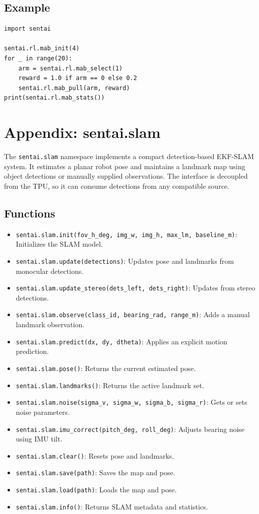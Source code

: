 \subsection{Example}\label{example-21}

\begin{verbatim}
import sentai

sentai.rl.mab_init(4)
for _ in range(20):
    arm = sentai.rl.mab_select(1)
    reward = 1.0 if arm == 0 else 0.2
    sentai.rl.mab_pull(arm, reward)
print(sentai.rl.mab_stats())
\end{verbatim}

\section{Appendix: sentai.slam}\label{appendix-sentai.slam}

The \texttt{sentai.slam} namespace implements a compact detection-based
EKF-SLAM system. It estimates a planar robot pose and maintains a
landmark map using object detections or manually supplied observations.
The interface is decoupled from the TPU, so it can consume detections
from any compatible source.

\subsection{Functions}\label{functions-22}

\begin{itemize}
\tightlist
\item
  \texttt{sentai.slam.init(fov\_h\_deg,\ img\_w,\ img\_h,\ max\_lm,\ baseline\_m)}:
  Initializes the SLAM model.
\item
  \texttt{sentai.slam.update(detections)}: Updates pose and landmarks
  from monocular detections.
\item
  \texttt{sentai.slam.update\_stereo(dets\_left,\ dets\_right)}: Updates
  from stereo detections.
\item
  \texttt{sentai.slam.observe(class\_id,\ bearing\_rad,\ range\_m)}:
  Adds a manual landmark observation.
\item
  \texttt{sentai.slam.predict(dx,\ dy,\ dtheta)}: Applies an explicit
  motion prediction.
\item
  \texttt{sentai.slam.pose()}: Returns the current estimated pose.
\item
  \texttt{sentai.slam.landmarks()}: Returns the active landmark set.
\item
  \texttt{sentai.slam.noise(sigma\_v,\ sigma\_w,\ sigma\_b,\ sigma\_r)}:
  Gets or sets noise parameters.
\item
  \texttt{sentai.slam.imu\_correct(pitch\_deg,\ roll\_deg)}: Adjusts
  bearing noise using IMU tilt.
\item
  \texttt{sentai.slam.clear()}: Resets pose and landmarks.
\item
  \texttt{sentai.slam.save(path)}: Saves the map and pose.
\item
  \texttt{sentai.slam.load(path)}: Loads the map and pose.
\item
  \texttt{sentai.slam.info()}: Returns SLAM metadata and statistics.
\end{itemize}

